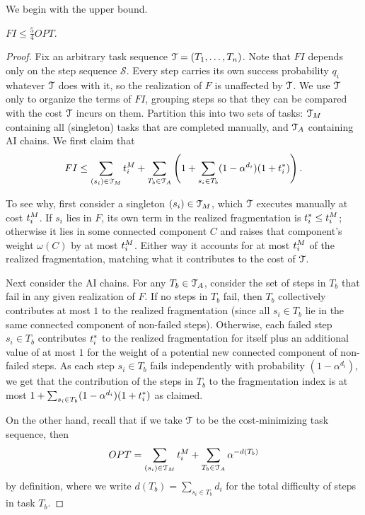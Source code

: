 We begin with the upper bound.

\begin{lem}
\label{lem:FI.upper.bound}
    $FI \leq \tfrac{5}{4}OPT$.
\end{lem}
\begin{proof}
Fix an arbitrary task sequence $\mathcal{T} = (T_1, \dotsc, T_n)$.
Note that $FI$ depends only on the step sequence $\mathcal{S}$.
Every step carries its own success probability $q_i$ whatever $\mathcal{T}$ does with it, so the realization of $F$ is unaffected by $\mathcal{T}$.
We use $\mathcal{T}$ only to organize the terms of $FI$, grouping steps so that they can be compared with the cost $\mathcal{T}$ incurs on them.
Partition this into two sets of tasks: $\mathcal{T}_{M}$ containing all (singleton) tasks that are completed manually, and $\mathcal{T}_{A}$ containing AI chains.
We first claim that
\[ 
FI 
\leq 
\sum_{(s_i) \in \mathcal{T}_{M}}t^{M}_{i}
+
\sum_{T_b \in \mathcal{T}_{A}}\left(1 + \sum_{s_i \in T_b}(1-\alpha^{d_i})(1+t^*_{i})\right). 
\]

To see why, first consider a singleton $(s_i) \in \mathcal{T}_{M}$, which $\mathcal{T}$ executes manually at cost $t^{M}_{i}$.
If $s_i$ lies in $F$, its own term in the realized fragmentation is $t^*_{i} \leq t^{M}_{i}$; otherwise it lies in some connected component $C$ and raises that component's weight $\omega(C)$ by at most $t^{M}_{i}$.
Either way it accounts for at most $t^{M}_{i}$ of the realized fragmentation, matching what it contributes to the cost of $\mathcal{T}$.

Next consider the AI chains.
For any $T_b \in \mathcal{T}_{A}$, consider the set of steps in $T_b$ that fail in any given realization of $F$.
If no steps in $T_b$ fail, then $T_b$ collectively contributes at most $1$ to the realized fragmentation (since all $s_i \in T_b$ lie in the same connected component of non-failed steps).
Otherwise, each failed step $s_i \in T_b$ contributes $t^*_{i}$ to the realized fragmentation for itself plus an additional value of at most $1$ for the weight of a potential new connected component of non-failed steps.
As each step $s_i \in T_b$ fails independently with probability $(1-\alpha^{d_i})$, we get that the contribution of the steps in $T_b$ to the fragmentation index is at most $1 + \sum_{s_i \in T_b}(1-\alpha^{d_i})(1+t^*_{i})$ as claimed.

On the other hand, recall that if we take $\mathcal{T}$ to be the cost-minimizing task sequence, then
\[ 
OPT 
= 
\sum_{(s_i) \in \mathcal{T}_{M}} t^{M}_{i} 
+
\sum_{T_b \in \mathcal{T}_{A}} \alpha^{-d(T_b)}
\]
by definition, where we write $d(T_b) = \sum_{s_i \in T_b}d_i$ for the total difficulty of steps in task $T_b$.


\end{proof}
